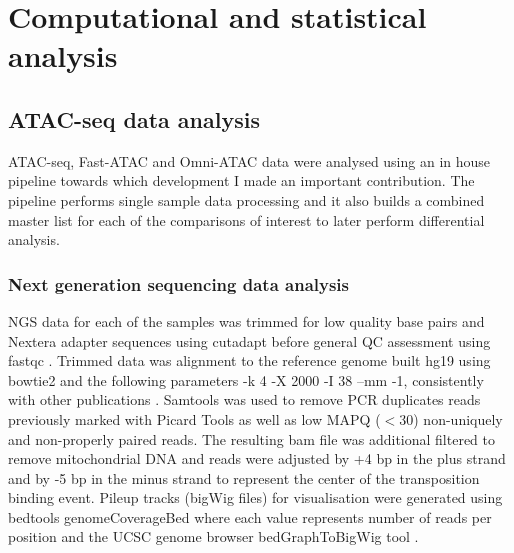 \section{Computational and statistical analysis}

\subsection{ATAC-seq data analysis}
\label{ATAC_analysis}
ATAC-seq, Fast-ATAC and Omni-ATAC data were analysed using an in house pipeline towards which development I made an important contribution. The pipeline performs single sample data processing and it also builds a combined master list for each of the comparisons of interest to later perform differential analysis. 

\subsubsection{Next generation sequencing data analysis}
NGS data for each of the samples was trimmed for low quality base pairs and Nextera adapter sequences using cutadapt \parencite{} before general QC assessment using fastqc \parencite{}. Trimmed data was alignment to the reference genome built hg19 using bowtie2 \parencite{Langmead2006} and the following parameters -k 4 -X 2000 -I 38 --mm -1, consistently with other publications \parencite{Buenrostro2013, Corces2016}. Samtools \parencite{} was used to remove PCR duplicates reads previously marked with Picard Tools \parencite{} as well as low MAPQ (${<}$30) non-uniquely and non-properly paired reads. The resulting bam file was additional filtered to remove mitochondrial DNA and reads were adjusted by +4 bp in the plus strand and by -5 bp in the minus strand to represent the center of the transposition binding event. Pileup tracks (bigWig files) for visualisation were generated using bedtools genomeCoverageBed where each value represents number of reads per position \parencite{} and the UCSC genome browser bedGraphToBigWig tool \parencite{}.  

